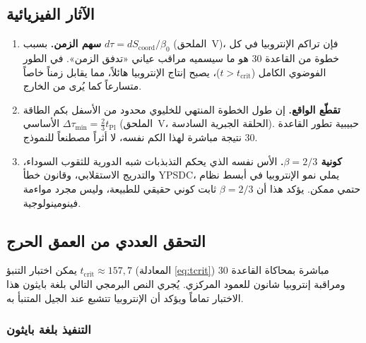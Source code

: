 \documentclass[12pt,a4paper]{article}
\begin{document}
	\subsection{الآثار الفيزيائية}
	\label{subsec:implications}
	
	\begin{enumerate}
		\item \textbf{سهم الزمن.} بسبب \(d\tau = dS_{\mathrm{coord}}/\beta_{0}\) (الملحق~V)، فإن تراكم الإنتروبيا في كل خطوة من القاعدة 30 هو ما سيسميه مراقب عياني «تدفق الزمن». في الطور الفوضوي الكامل (\(t > t_{\mathrm{crit}}\))، يصبح إنتاج الإنتروبيا هائلاً، مما يقابل زمناً خاصاً متسارعاً كما يُرى من الخارج.
		\item \textbf{تقطّع الواقع.} إن طول الخطوة المنتهي للخليوي محدود من الأسفل بكم الطاقة الأساسي \(\Delta\tau_{\min} = \frac{2}{3}t_{\mathrm{Pl}}\) (الملحق~V، الحلقة الجبرية السادسة). حبيبية تطور القاعدة 30 نتيجة مباشرة لهذا الكم نفسه، لا أثراً مصطنعاً للنموذج.
		\item \textbf{كونية \(\beta=2/3\).} الأس نفسه الذي يحكم التذبذبات شبه الدورية للثقوب السوداء، والتدريج الاستقلابي، وقانون خطأ YPSDC، يملي نمو الإنتروبيا في أبسط نظام حتمي ممكن. يؤكد هذا أن \(\beta=2/3\) ثابت كوني حقيقي للطبيعة، وليس مجرد مواءمة فينومينولوجية.
	\end{enumerate}
	
	\subsection{التحقق العددي من العمق الحرج}
	\label{subsec:verification}
	
	يمكن اختبار التنبؤ \(t_{\mathrm{crit}} \approx 157{,}7\) (المعادلة \ref{eq:tcrit}) مباشرة بمحاكاة القاعدة 30 ومراقبة إنتروبيا شانون للعمود المركزي. يُجري النص البرمجي التالي بلغة بايثون هذا الاختبار تماماً ويؤكد أن الإنتروبيا تتشبع عند الجيل المتنبأ به.
	
	\subsubsection*{التنفيذ بلغة بايثون}
	
\end{document}
